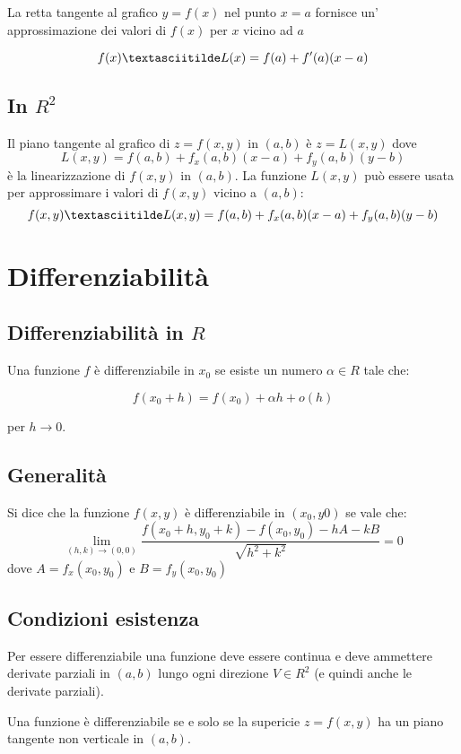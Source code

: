 La retta tangente al grafico $y=f(x)$ nel punto $x=a$ fornisce un' approssimazione dei valori di $f(x)$ per $x$ vicino ad $a$

$$f(x) \textasciitilde L(x) = f(a) + f'(a)(x-a)$$

\subsection{In $R^2$}

Il piano tangente al grafico di $z = f(x,y)$ in $(a,b)$ è $z = L(x,y)$ dove $$L(x,y) = f(a,b) + f_x(a,b)(x-a) + f_y(a,b)(y-b)$$ è la linearizzazione di $f(x,y)$ in $(a,b)$. La funzione $L(x,y)$ può essere usata per approssimare i valori di $f(x,y)$ vicino a $(a,b)$:
$$
f(x,y) \textasciitilde L(x,y) = f(a,b) + f_x(a,b)(x-a) + f_y(a,b)(y-b)
$$
\section{Differenziabilità}

\subsection{Differenziabilità in $R$}

Una funzione $f$ è differenziabile in $x_0$ se esiste un numero $\alpha \in R$ tale che:

$$f(x_0+h)=f(x_0)+\alpha h + o(h)$$

per $h \to 0$.

\subsection{Generalità}

Si dice che la funzione $f(x,y)$ è differenziabile in $(x_0,y0)$ se vale che:
$$
\lim_{(h,k)\to (0,0)} \frac{f(x_0+h,y_0+k) - f(x_0,y_0) - h A - k B}{\sqrt{h^2+k^2}} = 0
$$
dove $A=f_x(x_0,y_0)$ e $B=f_y(x_0,y_0)$

\subsection{Condizioni esistenza}

Per essere differenziabile una funzione deve essere continua e deve ammettere derivate parziali in $(a,b)$ lungo ogni direzione $V \in R^2$ (e quindi anche le derivate parziali).

Una funzione è differenziabile se e solo se la supericie $z=f(x,y)$ ha un piano tangente non verticale in $(a,b)$.

